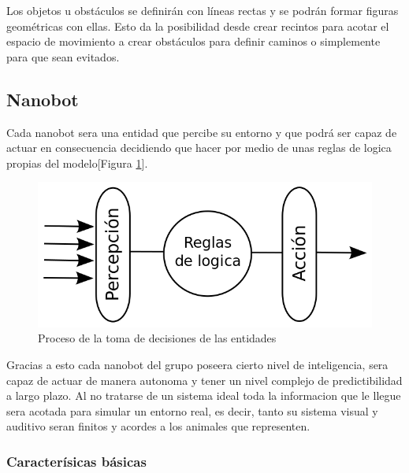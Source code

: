 Los objetos u obstáculos se definirán con líneas rectas y se podrán formar figuras geométricas con ellas.  Esto da la posibilidad desde crear recintos para acotar el espacio de movimiento a crear obstáculos para definir caminos o simplemente para que sean evitados.
 
\subsection{Nanobot}
\label{sec:nanobot}

Cada nanobot sera una entidad que percibe su entorno y que podrá ser capaz de actuar en consecuencia decidiendo que hacer por medio de unas reglas de logica propias del modelo[Figura \ref{fig:../images/procesoNanobot.png}].
\begin{figure}[h]
 \centering
 \includegraphics[scale=0.3]{../images/procesoNanobot.png}
 \caption{Proceso de la toma de decisiones de las entidades}
 \label{fig:../images/procesoNanobot.png}
\end{figure}

Gracias a esto cada nanobot del grupo poseera cierto nivel de inteligencia, sera capaz de actuar de manera autonoma y  tener un nivel complejo de predictibilidad  a largo plazo. Al no tratarse de un sistema ideal toda la informacion que le llegue sera acotada para simular un entorno real, es decir, tanto su sistema visual y auditivo seran finitos y acordes a los animales que representen.

\subsubsection{Caracterísicas básicas}
\label{sec:caracteristicas_basicas}

